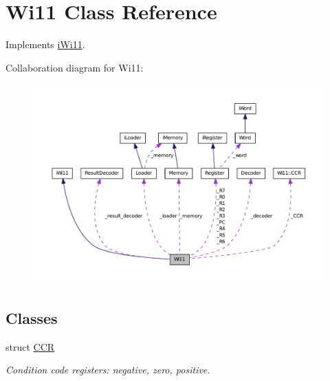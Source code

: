 \hypertarget{classWi11}{
\section{Wi11 Class Reference}
\label{classWi11}
}


Implements \hyperlink{classiWi11}{iWi11}.  




Collaboration diagram for Wi11:\nopagebreak
\begin{figure}[H]
\begin{center}
\leavevmode
\includegraphics[width=400pt]{classWi11__coll__graph}
\end{center}
\end{figure}
\subsection*{Classes}
\begin{DoxyCompactItemize}
\item 
struct \hyperlink{structWi11_1_1CCR}{CCR}
\begin{DoxyCompactList}\small\item\em Condition code registers: negative, zero, positive. \item\end{DoxyCompactList}\end{DoxyCompactItemize}
